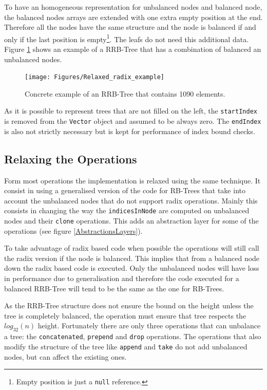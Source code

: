 To have an homogeneous representation for unbalanced nodes and balanced node, the balanced nodes arrays are extended with one extra empty position at the end. Therefore all the nodes have the same structure and the node is balanced if and only if the last position is empty\footnote{Empty position is just a \texttt{null} reference.}. The leafs do not need this additional data. Figure \ref{Relaxed_radix_example} shows an example of a RRB-Tree that has a combination of balanced an unbalanced nodes.

\begin{figure}[h!]
  \centering
  \texttt{[image: Figures/Relaxed\_radix\_example]}
  \caption{Concrete example of an RRB-Tree that contains 1090 elements.}
  \label{Relaxed_radix_example}
\end{figure}

As it is possible to represent trees that are not filled on the left, the \texttt{startIndex} is removed from the \texttt{Vector} object and assumed to be always zero. The \texttt{endIndex} is also not strictly necessary but is kept for performance of index bound checks.

\subsection{Relaxing the Operations}
Form most operations the implementation is relaxed using the same technique. It consist in using a generalised version of the code for RB-Trees that take into account the unbalanced nodes that do not support radix operations. Mainly this consists in changing the way the \texttt{indicesInNode} are computed on unbalanced nodes and their \texttt{clone} operations. This adds an abstraction layer for some of the operations (see figure \ref{AbstractionsLayers}).

To take advantage of radix based code when possible the operations will still call the radix version if the node is balanced. This implies that from a balanced node down the radix based code is executed. Only the unbalanced nodes will have loss in performance due to generalisation and therefore the code executed for a balanced RRB-Tree will tend to be the same as the one for RB-Trees.

As the RRB-Tree structure does not ensure the bound on the height unless the tree is completely balanced, the operation must ensure that tree respects the $log_{32}(n)$ height. Fortunately there are only three operations that can unbalance a tree: the \texttt{concatenated}, \texttt{prepend} and \texttt{drop} operations. The operations that also modify the structure of the tree like \texttt{append} and \texttt{take} do not add unbalanced nodes, but can affect the existing ones.

